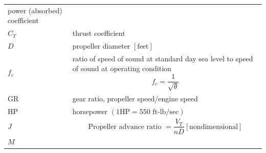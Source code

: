 \documentclass[
]{book}
\begin{document}
\begin{longtable}[]{@{}ll@{}}
\begin{minipage}[t]{0.80\columnwidth}
power (absorbed) coefficient\strut
\end{minipage}\tabularnewline
\begin{minipage}[t]{0.14\columnwidth}\raggedright
\(C_T\)\strut
\end{minipage} & \begin{minipage}[t]{0.80\columnwidth}\raggedright
thrust coefficient\strut
\end{minipage}\tabularnewline
\begin{minipage}[t]{0.14\columnwidth}\raggedright
\(D\)\strut
\end{minipage} & \begin{minipage}[t]{0.80\columnwidth}\raggedright
propeller diameter \(\left[ \text{feet} \right]\)\strut
\end{minipage}\tabularnewline
\begin{minipage}[t]{0.14\columnwidth}\raggedright
\(f_c\)\strut
\end{minipage} & \begin{minipage}[t]{0.80\columnwidth}\raggedright
ratio of speed of sound at standard day sea level to speed of sound at operating condition \[ f_c = \frac{1}{\sqrt{\theta}} \]\strut
\end{minipage}\tabularnewline
\begin{minipage}[t]{0.14\columnwidth}\raggedright
\(\mathrm{GR}\)\strut
\end{minipage} & \begin{minipage}[t]{0.80\columnwidth}\raggedright
gear ratio, propeller speed/engine speed\strut
\end{minipage}\tabularnewline
\begin{minipage}[t]{0.14\columnwidth}\raggedright
\(\mathrm{HP}\)\strut
\end{minipage} & \begin{minipage}[t]{0.80\columnwidth}\raggedright
horsepower \(\left (1\mathrm{HP} = 550 \text{ ft-lb/sec} \right)\)\strut
\end{minipage}\tabularnewline
\begin{minipage}[t]{0.14\columnwidth}\raggedright
\(J\)\strut
\end{minipage} & \begin{minipage}[t]{0.80\columnwidth}\raggedright
\[ \text{Propeller advance ratio } = \frac{V_T}{nD} \left[ \text{nondimensional} \right] \]\strut
\end{minipage}\tabularnewline
\begin{minipage}[t]{0.14\columnwidth}\raggedright
\(M\)\strut
\end{minipage} & \begin{minipage}[t]{0.80\columnwidth}\raggedright

\end{minipage}
\end{longtable}
\end{document}
